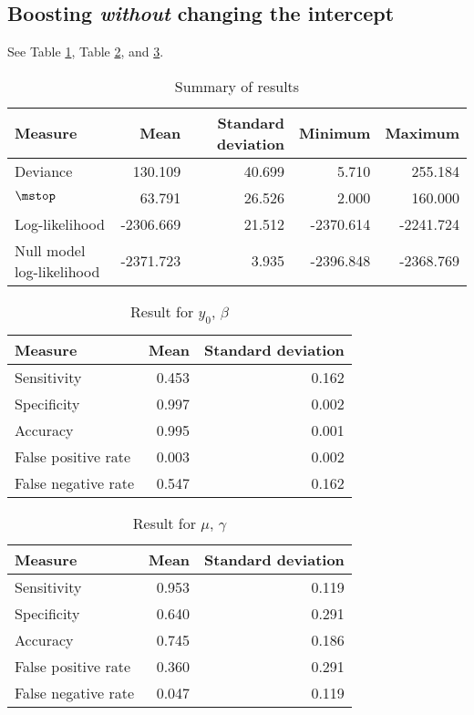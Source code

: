 \subsection{Boosting \textit{without} changing the intercept}
See Table \ref{table:non-correlated-no-intercept-summary}, Table \ref{table:non-correlated-no-intercept-y0}, and \ref{table:non-correlated-no-intercept-mu}.
\begin{table}\caption{Summary of results}\label{table:non-correlated-no-intercept-summary}
\begin{tabular}{l|rrrr}
Measure &    Mean &     Standard deviation &  Minimum & Maximum \\
\hline
Deviance    &   130.109 & 40.699 &     5.710 &   255.184 \\
$\mstop$      &    63.791 & 26.526 &     2.000 &   160.000 \\
Log-likelihood      & -2306.669 & 21.512 & -2370.614 & -2241.724 \\
Null model log-likelihood & -2371.723 &  3.935 & -2396.848 & -2368.769
\end{tabular}
\end{table}

\begin{table}\caption{Result for $y_0$, $\beta$}\label{table:non-correlated-no-intercept-y0}
\begin{tabular}{l|rr}
Measure &  Mean &    Standard deviation \\
\hline
Sensitivity & 0.453 & 0.162 \\
Specificity & 0.997 & 0.002 \\
Accuracy    & 0.995 & 0.001 \\
False positive rate         & 0.003 & 0.002 \\
False negative rate         & 0.547 & 0.162
\end{tabular}
\end{table}


\begin{table}\caption{Result for $\mu$, $\gamma$}\label{table:non-correlated-no-intercept-mu}
\begin{tabular}{l|rr}
Measure &  Mean & Standard deviation \\
\hline
Sensitivity & 0.953 & 0.119 \\
Specificity & 0.640 & 0.291 \\
Accuracy    & 0.745 & 0.186 \\
False positive rate         & 0.360 & 0.291 \\
False negative rate         & 0.047 & 0.119
\end{tabular}
\end{table}


